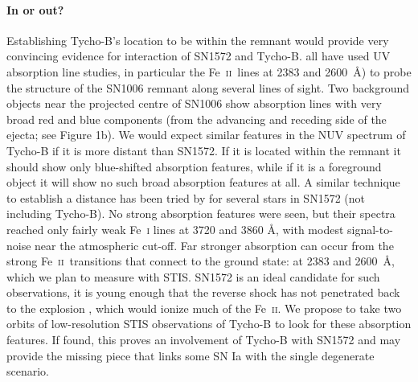 \documentclass[12pt]{article}
\newcommand{\feii}{Fe~\textsc{ii}}
\begin{document}
\paragraph{In or out?}
Establishing Tycho-B's location to be within the remnant would provide very convincing evidence for interaction of SN1572 and Tycho-B. 
\cite{1988ApJ...327..164F,1993ApJ...416..247W, 2005ApJ...624..189W} all have used UV absorption line studies, in particular the \feii\ lines at 2383 and 2600~\AA) to probe the structure of the SN1006 remnant along several lines of sight. Two background objects near the projected centre of SN1006  \citep[the Schweizer-Middleditch 1980 star -][ - and a $z \approx 1$ QSO]{1980ApJ...241.1039S} show absorption lines with very broad red and blue components (from the advancing and receding side of the ejecta; see Figure 1b).  We would expect similar features in the NUV spectrum of Tycho-B if it is more distant than SN1572.   If it is located  within the remnant it should  show only blue-shifted absorption features, while if it is a foreground object it will show no such broad absorption features at all. A similar technique to establish a distance has been tried by \citet{2007PASJ...59..811I} for  several stars in SN1572 (not including Tycho-B).  No strong absorption features were seen, but their spectra reached only fairly weak Fe~\textsc{i} lines at 3720 and 3860 \AA, with modest signal-to-noise near the atmospheric cut-off.
Far stronger absorption can occur  from the strong \feii\ transitions that connect to the ground state: at 2383 and 2600~\AA, which we plan to measure with STIS. SN1572 is an ideal candidate for such observations, it is young enough that the reverse shock has not penetrated back to the explosion \citep[current radius 183\arcsec;][]{2005ApJ...634..376W}, which would  ionize much of the \feii. We propose to take two orbits of low-resolution STIS observations of Tycho-B to look for these absorption features. If found,  this proves an involvement of Tycho-B with SN1572 and may provide the missing piece that links some SN Ia with the single degenerate scenario.
\end{document}
